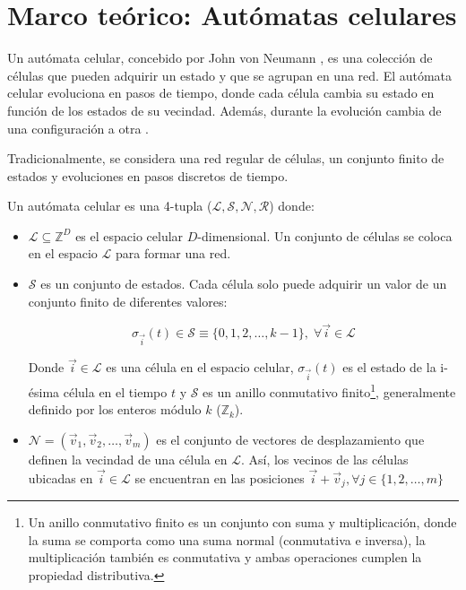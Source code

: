\chapter{Marco teórico: Autómatas celulares}

Un autómata celular, concebido por John von Neumann \cite{vonNeumann1948}, es una colección de células que pueden adquirir un estado y que se agrupan en una red. El autómata celular evoluciona en pasos de tiempo, donde cada célula cambia su estado en función de los estados de su vecindad.  Además, durante la evolución cambia de una configuración a otra \cite{weissteinCA, wolfram1982, ca_fsancho}. 

Tradicionalmente, se considera una red regular de células, un conjunto finito de estados y evoluciones en pasos discretos de tiempo.

\begin{definition}
	
	Un autómata celular es una 4-tupla ($\mathcal{L}, \mathcal{S}, \mathcal{N}, \mathcal{R}$) donde:
	
	
	
	\begin{itemize}
		
		\item $\mathcal{L} \subseteq \mathbb{Z}^D$ es el espacio celular $D$-dimensional. Un conjunto de células se coloca en el espacio $\mathcal{L}$ para formar una red.
		
		
		
		\item $\mathcal{S}$ es un conjunto de estados. Cada célula solo puede adquirir un valor de un conjunto finito de diferentes valores:
		
		\[
		\sigma_{\vec{i}}(t) \in \mathcal{S} \equiv \{ 0, 1,2, \dots, k - 1 \},\; \forall \vec{i} \in \mathcal{L}
		\]
		
		Donde $\vec{i} \in \mathcal{L}$ es una célula en el espacio celular, $\sigma_{\vec{i}} (t)$ es el estado de la i-ésima célula en el tiempo $t$ y $\mathcal{S}$ es un anillo conmutativo finito\footnote{Un anillo conmutativo finito es un conjunto con suma y multiplicación, donde la suma se comporta como una suma normal (conmutativa e inversa), la multiplicación también es conmutativa y ambas operaciones cumplen la propiedad distributiva.}, generalmente definido por los enteros módulo $k$ ($\mathbb{Z}_k$).
		
		
		
		\item $\mathcal{N} = (\vec{v}_1, \vec{v}_2, \dots, \vec{v}_m )$ es el conjunto de vectores de desplazamiento que definen la vecindad de una célula en $\mathcal{L}$. Así, los vecinos de las células ubicadas en $\vec{i} \in \mathcal{L}$ se encuentran en las posiciones $\vec{i} + \vec{v}_j, \forall j \in \{ 1,2, \dots, m \}$ 
		

\end{itemize}
\end{definition}

